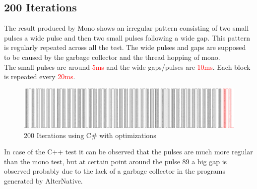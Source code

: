 \subsection{200 Iterations}\label{SS:200-iterations}
The result produced by Mono shows an irregular pattern consisting of two small pulses a wide pulse and then two small pulses following a wide gap. This pattern is regularly repeated across all the test. The wide pulses and gaps are supposed to be caused by the garbage collector and the thread hopping of mono.
\\
The small pulses are around \textcolor{red}{5ms} and the wide gaps/pulses are \textcolor{red}{10ms}. Each block is repeated every \textcolor{red}{20ms}.

\begin{figure}[H]\begin{center}
 \centering
  \captionsetup{justification=centering}
  \includegraphics[width=1\textwidth]{pictures/performance-tests/GPIO/200/csharp}
  \caption{200 Iterations using C\# with optimizations \label{fig:gpio-200it-csharp}}
\end{center}\end{figure}

In case of the C++ test it can be observed that the pulses are much more regular than the mono test, but at certain point around the pulse 89 a big gap is observed probably due to the lack of a garbage collector in the programs generated by AlterNative.

